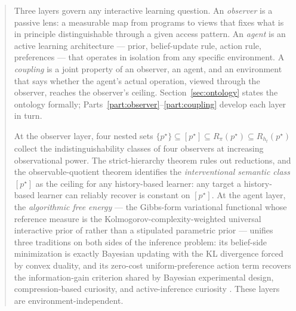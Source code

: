 \documentclass[11pt]{article}
\theoremstyle{definition}
\theoremstyle{remark}
\begin{document}
\begin{abstract}
Three layers govern any interactive learning question. An \emph{observer} is a passive lens: a measurable map from programs to views that fixes what is in principle distinguishable through a given access pattern. An \emph{agent} is an active learning architecture --- prior, belief-update rule, action rule, preferences --- that operates in isolation from any specific environment. A \emph{coupling} is a joint property of an observer, an agent, and an environment that says whether the agent's actual operation, viewed through the observer, reaches the observer's ceiling. Section~\ref{sec:ontology} states the ontology formally; Parts~\ref{part:observer}--\ref{part:coupling} develop each layer in turn.

\medskip
\noindent
At the observer layer, four nested sets $\{p^\star\}\subseteq[p^\star]\subseteq R_\pi(p^\star)\subseteq R_{h_t}(p^\star)$ collect the indistinguishability classes of four observers at increasing observational power. The strict-hierarchy theorem rules out reductions, and the observable-quotient theorem identifies the \emph{interventional semantic class} $[p^\star]$ as the ceiling for any history-based learner: any target a history-based learner can reliably recover is constant on $[p^\star]$. At the agent layer, the \emph{algorithmic free energy} --- the Gibbs-form variational functional whose reference measure is the Kolmogorov-complexity-weighted universal interactive prior of \citet{Solomonoff1964a,Solomonoff1964b,Kolmogorov1965,Hutter2005} rather than a stipulated parametric prior --- unifies three traditions on both sides of the inference problem: its belief-side minimization is exactly Bayesian updating with the KL divergence forced by convex duality, and its zero-cost uniform-preference action term recovers the information-gain criterion shared by Bayesian experimental design, compression-based curiosity, and active-inference curiosity \citep{Friston2010,Lindley1956,ChalonerVerdinelli1995,MacKay1992,OrtegaBraun2013,Schmidhuber1991,Schmidhuber2010}. These layers are environment-independent.


\end{abstract}
\end{document}
